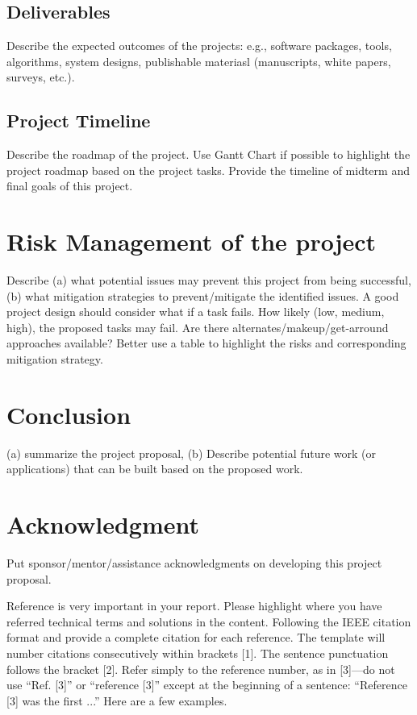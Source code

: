 \documentclass[conference,12pt]{IEEEtran}
\begin{document}
\subsection{Deliverables}
Describe the expected outcomes of the projects: e.g., software packages, tools, algorithms, system designs, publishable materiasl (manuscripts, white papers, surveys, etc.).
\subsection{Project Timeline}
Describe the roadmap of the project. Use Gantt Chart if possible to highlight the project roadmap based on the project tasks. Provide the timeline of midterm and final goals of this project.
\section{Risk Management of the project}
Describe (a) what potential issues may prevent this project from being successful, (b) what mitigation strategies to prevent/mitigate the identified issues. A good project design should consider what if a task fails. How likely (low, medium, high), the proposed tasks may fail. Are there alternates/makeup/get-arround approaches available? Better use  a table to highlight the risks and corresponding mitigation strategy.

\section{Conclusion}
(a) summarize the project proposal, (b) Describe potential future work (or applications) that can be built based on the proposed work. 
\section{Acknowledgment }
Put sponsor/mentor/assistance acknowledgments on developing this project proposal.

Reference is very important in your report. Please highlight where you have
referred technical terms and solutions in the content. Following the IEEE
citation format and provide a complete citation for each reference. The template
will number citations consecutively within brackets [1]. The sentence
punctuation follows the bracket [2]. Refer simply to the reference number, as in
[3]—do not use “Ref. [3]” or “reference [3]” except at the beginning of
a sentence: “Reference [3] was the first ...” Here are a few examples.    \autocite{huang_ipv6_2014}
\printbibliography

    
\end{document}
